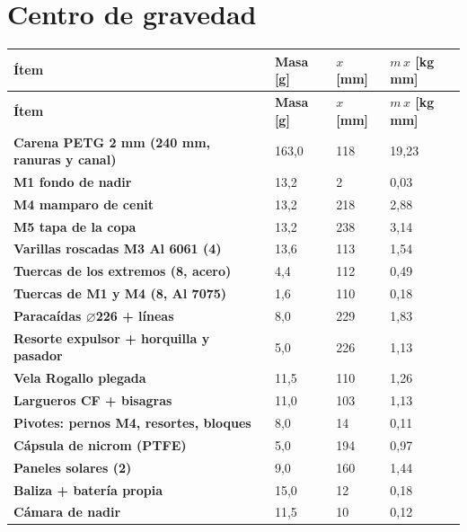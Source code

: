 \documentclass[10pt,a4paper]{article}
\newcommand{\diam}{\ensuremath{\varnothing}}
\begin{document}
\section{Centro de gravedad}
\par{\footnotesize\begin{longtable}{P{9.6cm}P{1.5cm}P{1.4cm}P{2.0cm}}
\color{white}\bfseries Ítem & \color{white}\bfseries Masa [g] & \color{white}\bfseries $x$ [mm] & \color{white}\bfseries $m\,x$ [kg\,mm] \\ \endfirsthead
{}\color{white}\bfseries Ítem & \color{white}\bfseries Masa [g] & \color{white}\bfseries $x$ [mm] & \color{white}\bfseries $m\,x$ [kg\,mm] \\ \endhead
{}\bfseries Carena PETG 2 mm (240 mm, ranuras y canal) & 163,0 & 118 & 19,23 \\
\bfseries M1 fondo de nadir & 13,2 & 2 & 0,03 \\
\bfseries M4 mamparo de cenit & 13,2 & 218 & 2,88 \\
\bfseries M5 tapa de la copa & 13,2 & 238 & 3,14 \\
\bfseries Varillas roscadas M3 Al 6061 (4) & 13,6 & 113 & 1,54 \\
\bfseries Tuercas de los extremos (8, acero) & 4,4 & 112 & 0,49 \\
\bfseries Tuercas de M1 y M4 (8, Al 7075) & 1,6 & 110 & 0,18 \\
\bfseries Paracaídas \diam{}226 + líneas & 8,0 & 229 & 1,83 \\
\bfseries Resorte expulsor + horquilla y pasador & 5,0 & 226 & 1,13 \\
\bfseries Vela Rogallo plegada & 11,5 & 110 & 1,26 \\
\bfseries Largueros CF + bisagras & 11,0 & 103 & 1,13 \\
\bfseries Pivotes: pernos M4, resortes, bloques & 8,0 & 14 & 0,11 \\
\bfseries Cápsula de nicrom (PTFE) & 5,0 & 194 & 0,97 \\
\bfseries Paneles solares (2) & 9,0 & 160 & 1,44 \\
\bfseries Baliza + batería propia & 15,0 & 12 & 0,18 \\
\bfseries Cámara de nadir & 11,5 & 10 & 0,12 \\

\end{longtable}}
\end{document}
